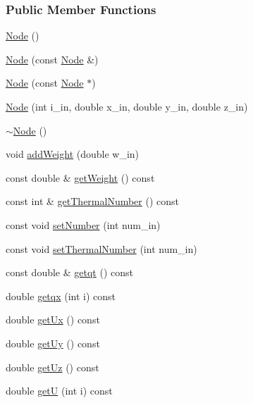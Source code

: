 \subsubsection*{Public Member Functions}
\begin{DoxyCompactItemize}
\item 
\hyperlink{classmknix_1_1_node_ad5856bda16e785c0900ee1d6c18ccecb}{Node} ()
\item 
\hyperlink{classmknix_1_1_node_a2e851819b5478c2110bbbd71fec6a3bb}{Node} (const \hyperlink{classmknix_1_1_node}{Node} \&)
\item 
\hyperlink{classmknix_1_1_node_a6c100ae73d994c428f494257158cdeac}{Node} (const \hyperlink{classmknix_1_1_node}{Node} $\ast$)
\item 
\hyperlink{classmknix_1_1_node_a14799609698201dafea7d60684c12708}{Node} (int i\+\_\+in, double x\+\_\+in, double y\+\_\+in, double z\+\_\+in)
\item 
\hyperlink{classmknix_1_1_node_adb415bbf3cd9031c1b45f3b2d36282e2}{$\sim$\+Node} ()
\item 
void \hyperlink{classmknix_1_1_node_a53140afb6f6f4dcffb1003e7fc86172d}{add\+Weight} (double w\+\_\+in)
\item 
const double \& \hyperlink{classmknix_1_1_node_a946a43c363840d91a43e67df2b86c7cc}{get\+Weight} () const 
\item 
const int \& \hyperlink{classmknix_1_1_node_ad059c208f7a15ab06ddcf33114b1481a}{get\+Thermal\+Number} () const 
\item 
const void \hyperlink{classmknix_1_1_node_a6c08fe7fdeb154268c4a0a6e435bc561}{set\+Number} (int num\+\_\+in)
\item 
const void \hyperlink{classmknix_1_1_node_a66721f6650b7dd60df0462eb248eb3d0}{set\+Thermal\+Number} (int num\+\_\+in)
\item 
const double \& \hyperlink{classmknix_1_1_node_a933dcd435f4c1602da93b4d8faa51559}{getqt} () const 
\item 
double \hyperlink{classmknix_1_1_node_a081aee47cbdb57f842b29f95871020d3}{getqx} (int i) const 
\item 
double \hyperlink{classmknix_1_1_node_a5fe741fd520be4c7dd2edeb6c1172f84}{get\+Ux} () const 
\item 
double \hyperlink{classmknix_1_1_node_a88db2370f5830ed5692667d8d2351d46}{get\+Uy} () const 
\item 
double \hyperlink{classmknix_1_1_node_a4b960a47e276e247f16561f16938a2c7}{get\+Uz} () const 
\item 
double \hyperlink{classmknix_1_1_node_acd6352d9d9a80433c62bcad26547c654}{get\+U} (int i) const 

\end{DoxyCompactItemize}
